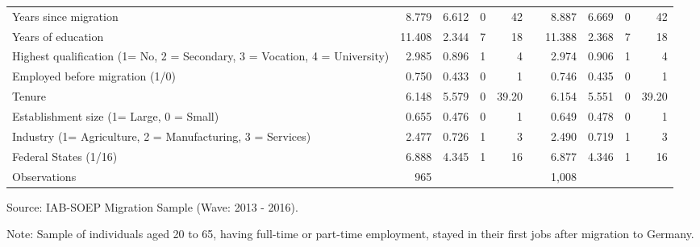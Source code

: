\documentclass[12pt,a4paper]{article}
\begin{document}
\begin{center}
\begin{table}[htbp]
{\begin{tabular}{lrrrrrrrrr}
    Years since migration & 8.779 & 6.612 & 0     & 42    &       & 8.887 & 6.669 & 0     & 42 \\
    Years of education & 11.408 & 2.344 & 7     & 18    &       & 11.388 & 2.368 & 7     & 18 \\
    \multicolumn{1}{p{19.7em}}{Highest qualification (1= No, 2 = Secondary, 3 = Vocation, 4 = University)} & 2.985 & 0.896 & 1     & 4     &       & 2.974 & 0.906 & 1     & 4 \\
    Employed before migration (1/0) & 0.750 & 0.433 & 0     & 1     &       & 0.746 & 0.435 & 0     & 1 \\
    Tenure & 6.148 & 5.579 & 0     & 39.20 &       & 6.154 & 5.551 & 0     & 39.20 \\
    Establishment size (1= Large, 0 = Small) & 0.655 & 0.476 & 0     & 1     &       & 0.649 & 0.478 & 0     & 1 \\
    \multicolumn{1}{p{19.7em}}{Industry (1= Agriculture, 2 = Manufacturing, 3 = Services)} & 2.477 & 0.726 & 1     & 3     &       & 2.490 & 0.719 & 1     & 3 \\
    \multicolumn{1}{p{19.7em}}{Federal States (1/16)} & 6.888 & 4.345 & 1     & 16     &       & 6.877 & 4.346 & 1     & 16 \\
    \midrule
    Observations & 965   &       &       &       &       &      1,008    &       &       &  \\
    \bottomrule
    \end{tabular}%
}
 \begin{tablenotes}
      \small
      \item Source: IAB-SOEP Migration Sample (Wave: 2013 - 2016). 
      \item Note: Sample of individuals aged 20 to 65, having full-time or part-time employment, stayed in their first jobs after migration to Germany. 
    \end{tablenotes}
\end{table}%
\end{center}
\end{document}
